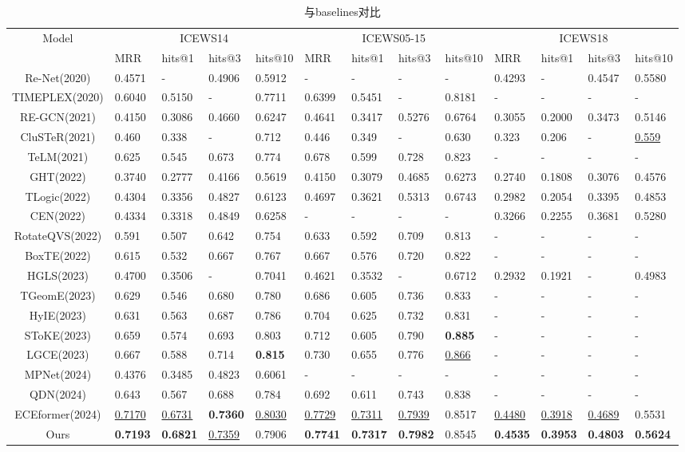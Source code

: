 \documentclass[a4paper, AutoFakeBold]{article}
\begin{document}
\begin{table}
	\centering
	\caption{与baselines对比}
	\fontsize{6}{8}\selectfont
	\label{tab3}
	\begin{tabular}{c | llll | llll | llll }
		\toprule  %
		\multirow{2}{*}{Model}&\multicolumn{4}{c|}{ICEWS14}&\multicolumn{4}{c|}{ICEWS05-15}&\multicolumn{4}{c}{ICEWS18} \\
		&MRR&hits@1&hits@3&hits@10&MRR&hits@1&hits@3&hits@10&MRR&hits@1&hits@3&hits@10 \\
		\midrule  %
		Re-Net(2020)&0.4571&-&0.4906&0.5912&-&-&-&-&0.4293&-&0.4547&0.5580 \\
		TIMEPLEX(2020)&0.6040&0.5150&-&0.7711&0.6399&0.5451&-&0.8181&-&-&-&- \\
		RE-GCN(2021)&0.4150&0.3086&0.4660&0.6247&0.4641&0.3417&0.5276&0.6764&0.3055&0.2000&0.3473&0.5146 \\
		CluSTeR(2021)&0.460&0.338&-&0.712&0.446&0.349&-&0.630&0.323&0.206&-&\underline{0.559} \\
		TeLM(2021)&0.625&0.545&0.673&0.774&0.678&0.599&0.728&0.823&-&-&-&- \\
		GHT(2022)&0.3740&0.2777&0.4166&0.5619&0.4150&0.3079&0.4685&0.6273&0.2740&0.1808&0.3076&0.4576 \\
		TLogic(2022)&0.4304&0.3356&0.4827&0.6123&0.4697&0.3621&0.5313&0.6743&0.2982&0.2054&0.3395&0.4853 \\
		CEN(2022)&0.4334&0.3318&0.4849&0.6258&-&-&-&-&0.3266&0.2255&0.3681&0.5280 \\
		RotateQVS(2022)&0.591&0.507&0.642&0.754&0.633&0.592&0.709&0.813&-&-&-&- \\
		BoxTE(2022)&0.615&0.532&0.667&0.767&0.667&0.576&0.720&0.822&-&-&-&- \\
		HGLS(2023)&0.4700&0.3506&-&0.7041&0.4621&0.3532&-&0.6712&0.2932&0.1921&-&0.4983 \\
		TGeomE(2023)&0.629&0.546&0.680&0.780&0.686&0.605&0.736&0.833&-&-&-&- \\
		HyIE(2023)&0.631&0.563&0.687&0.786&0.704&0.625&0.732&0.831&-&-&-&- \\
		SToKE(2023)&0.659&0.574&0.693&0.803&0.712&0.605&0.790&\textbf{0.885}&-&-&-&- \\
		LGCE(2023)&0.667&0.588&0.714&\textbf{0.815}&0.730&0.655&0.776&\underline{0.866}&-&-&-&- \\
		MPNet(2024)&0.4376&0.3485&0.4823&0.6061&-&-&-&-&-&-&-&- \\
		QDN(2024)&0.643&0.567&0.688&0.784&0.692&0.611&0.743&0.838&-&-&-&- \\
		ECEformer(2024)&\underline{0.7170}&\underline{0.6731}&\textbf{0.7360}&\underline{0.8030}&\underline{0.7729}&\underline{0.7311}&\underline{0.7939}&0.8517&\underline{0.4480}&\underline{0.3918}&\underline{0.4689}&0.5531 \\
		\midrule  %
		Ours&\textbf{0.7193}&\textbf{0.6821}&\underline{0.7359}&0.7906&\textbf{0.7741}&\textbf{0.7317}&\textbf{0.7982}&0.8545&\textbf{0.4535}&\textbf{0.3953}&\textbf{0.4803}&\textbf{0.5624} \\
		\bottomrule  %
	\end{tabular}
\end{table}
\end{document}
